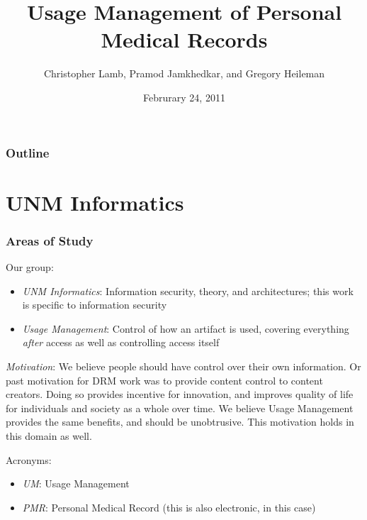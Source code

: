 \documentclass[t, 10pt]{beamer}
\title{Usage Management of Personal Medical Records}
\author [Chris]{Christopher Lamb, Pramod Jamkhedkar, and Gregory Heileman}
\institute[University of New Mexico]{
\inst {}Department of Electrical and Computer Engineering\\
University of New Mexico}
\date{Februrary 24, 2011}
\begin{document}
\begin{frame}
\titlepage
\end{frame}


\begin{frame}
\frametitle{Outline}
\tableofcontents 
\end{frame}

\section{UNM Informatics}
\begin{frame}
\frametitle{Areas of Study}

Our group:
\begin{itemize}
\item \textit{UNM Informatics}: Information security, theory, and architectures; this work is specific to information security 
\item \textit{Usage Management}: Control of how an artifact is used, covering everything \textit{after} access as well as controlling access itself
\end{itemize}
\pause

\textit{Motivation}: We believe people should have control over their own information.  Or past motivation for DRM work was to provide content control to content creators.  Doing so provides incentive for innovation, and improves quality of life for individuals and society as a whole over time.  We believe Usage Management provides the same benefits, and should be unobtrusive.
\newline
\newline
This motivation holds in this domain as well.
\pause

Acronyms:
\begin{itemize}
\item \textit{UM}: Usage Management
\item \textit{PMR}: Personal Medical Record (this is also electronic, in this case)
\end{itemize}

\end{frame}
\end{document}
